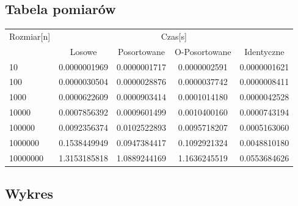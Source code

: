 \documentclass[13pt]{article}
\begin{document}
\subsection{Tabela pomiarów}

\begin{center}
\begin{tabular}{lcccc} 
\\ 
\toprule
Rozmiar[n] & \multicolumn{4}{c}{Czas[s]} \\
\cmidrule(r){2-5}
 & Losowe & Posortowane & O-Posortowane & Identyczne \\
\midrule
10       & 0.0000001969  & 0.0000001717  & 0.0000002591  & 0.0000001621 \\
100      & 0.0000030504  & 0.0000028876  & 0.0000037742  & 0.0000008411 \\
1000     & 0.0000622609  & 0.0000903414  & 0.0001014180  & 0.0000042528 \\
10000    & 0.0007856392  & 0.0009601499  & 0.0010400160  & 0.0000743194 \\
100000   & 0.0092356374  & 0.0102522893  & 0.0095718207  & 0.0005163060 \\
1000000  & 0.1538449949  & 0.0947384417  & 0.1092921324  & 0.0048810180 \\
10000000 & 1.3153185818  & 1.0889244169  & 1.1636245519  & 0.0553684626 \\
\bottomrule
\end{tabular}
\end{center}

\subsection{Wykres}
\end{document}
